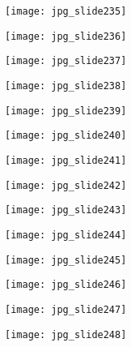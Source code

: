 \documentclass[main.tex]{subfiles}
\begin{document}
\begin{center}
\texttt{[image: jpg\_slide235]}
\end{center}

\begin{center}
\texttt{[image: jpg\_slide236]}
\end{center}

\begin{center}
\texttt{[image: jpg\_slide237]}
\end{center}

\begin{center}
\texttt{[image: jpg\_slide238]}
\end{center}

\begin{center}
\texttt{[image: jpg\_slide239]}
\end{center}

\begin{center}
\texttt{[image: jpg\_slide240]}
\end{center}

\begin{center}
\texttt{[image: jpg\_slide241]}
\end{center}

\begin{center}
\texttt{[image: jpg\_slide242]}
\end{center}

\begin{center}
\texttt{[image: jpg\_slide243]}
\end{center}

\begin{center}
\texttt{[image: jpg\_slide244]}
\end{center}

\begin{center}
\texttt{[image: jpg\_slide245]}
\end{center}

\begin{center}
\texttt{[image: jpg\_slide246]}
\end{center}

\begin{center}
\texttt{[image: jpg\_slide247]}
\end{center}

\begin{center}
\texttt{[image: jpg\_slide248]}
\end{center}
\end{document}
